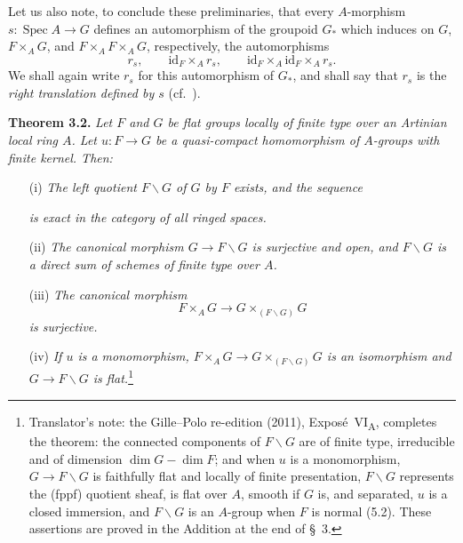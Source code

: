 Let us also note, to conclude these preliminaries, that every
\(A\)-morphism \(s:\operatorname{Spec}A\to G\) defines an automorphism
of the groupoid \(G_*\) which induces on \(G\), \(F\times_A G\), and
\(F\times_A F\times_A G\), respectively, the automorphisms
\[
  r_s,\qquad
  \mathrm{id}_F\times_A r_s,\qquad
  \mathrm{id}_F\times_A\mathrm{id}_F\times_A r_s.
\]
We shall again write \(r_s\) for this automorphism of \(G_*\), and
shall say that \(r_s\) is the \emph{right translation defined by
\(s\)} (cf.\ ).

\medskip
{}\label{thm:sga3-VIA-3.2}%
\noindent\textbf{Theorem 3.2.}
\textit{Let \(F\) and \(G\) be flat groups locally of finite type over
an Artinian local ring \(A\). Let \(u:F\to G\) be a quasi-compact
homomorphism of \(A\)-groups with finite kernel. Then:}
\begin{enumerate}
\item[\SGAInlineRefTarget{thm:sga3-VIA-3.2:item:i}(i)] \textit{The left quotient \(F\backslash G\) of \(G\) by
\(F\) exists, and the sequence}
\begin{center}
  \label{diag:sga3-VIA-3.2-exact-sequence}%
\end{center}
\textit{is exact in the category of all ringed spaces.}

\item[\SGAInlineRefTarget{thm:sga3-VIA-3.2:item:ii}(ii)] \textit{The canonical morphism
\(G\to F\backslash G\) is surjective and open, and
\(F\backslash G\) is a direct sum of schemes of finite type over
\(A\).}

\item[\SGAInlineRefTarget{thm:sga3-VIA-3.2:item:iii}(iii)] \textit{The canonical morphism
\[
  F\times_A G\longrightarrow G\times_{(F\backslash G)}G
\]
is surjective.}

\item[(iv)]\label{concl:sga3-VIA-3.2-iv} \textit{If \(u\) is a monomorphism,
\(F\times_A G\to G\times_{(F\backslash G)}G\) is an isomorphism and
\(G\to F\backslash G\) is flat.}\footnote{Translator's note: the Gille--Polo re-edition (2011),
Exposé~VI\textsubscript{A}, completes the theorem: the connected components of \(F\backslash G\)
are of finite type, irreducible and of dimension \(\dim G-\dim F\); and when \(u\) is a
monomorphism, \(G\to F\backslash G\) is faithfully flat and locally of finite presentation,
\(F\backslash G\) represents the (fppf) quotient sheaf, is flat over \(A\), smooth if \(G\) is, and
separated, \(u\) is a closed immersion, and \(F\backslash G\) is an \(A\)-group when \(F\) is normal
(5.2). These assertions are proved in the Addition at the end of \S~3.}
\end{enumerate}

